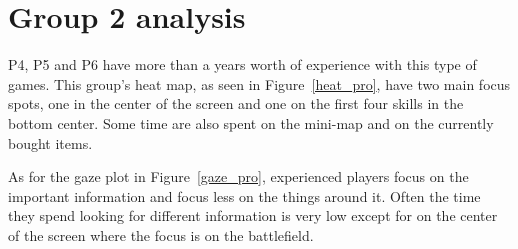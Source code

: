 \documentclass[notitlepage]{report}
\begin{document}
\section{Group 2 analysis}
P4, P5 and P6 have more than a years worth of experience with this type of games. This group's heat map, as seen in Figure~\ref{heat_pro}, have two main focus spots, one in the center of the screen and one on the first four skills in the bottom center. Some time are also spent on the mini-map and on the currently bought items.

As for the gaze plot in Figure~\ref{gaze_pro}, experienced players focus on the important information and focus less on the things around it. Often the time they spend looking for different information is very low except for on the center of the screen where the focus is on the battlefield.
\end{document}

